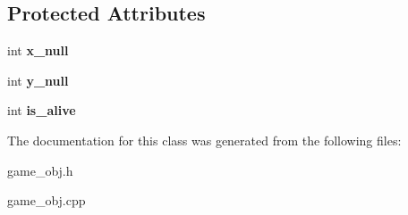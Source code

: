 \subsection*{Protected Attributes}
\begin{DoxyCompactItemize}
\item 
\mbox{\label{class_game_object_af6bddae0e71befe7cabe76c63c1cf5ea}} 
int {\bfseries x\+\_\+null}
\item 
\mbox{\label{class_game_object_a681a040b87cf751ad9618f1013b0e7e6}} 
int {\bfseries y\+\_\+null}
\item 
\mbox{\label{class_game_object_a94369b2b3bce43a9ff9655f5530c4f4a}} 
int {\bfseries is\+\_\+alive}
\end{DoxyCompactItemize}


The documentation for this class was generated from the following files\+:\begin{DoxyCompactItemize}
\item 
game\+\_\+obj.\+h\item 
game\+\_\+obj.\+cpp\end{DoxyCompactItemize}

